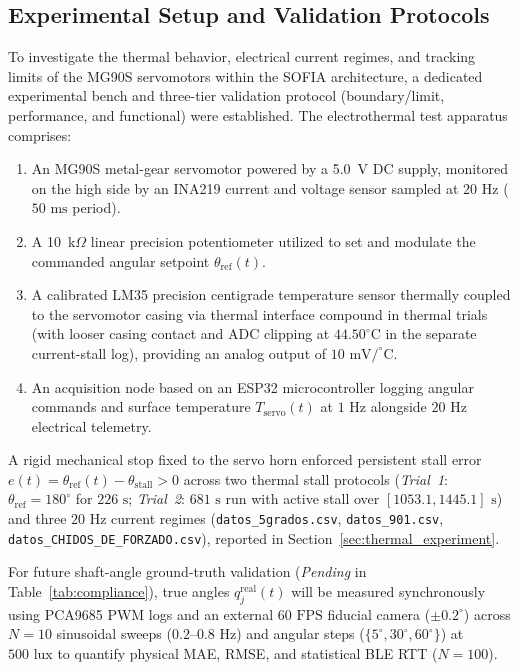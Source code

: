 \documentclass[lettersize,journal]{IEEEtran}
\begin{document}
	\subsection{Experimental Setup and Validation Protocols}
	\label{sec:thermal_setup}
	
	To investigate the thermal behavior, electrical current regimes, and tracking limits of the MG90S servomotors within the SOFIA architecture, a dedicated experimental bench and three-tier validation protocol (boundary/limit, performance, and functional) were established. The electrothermal test apparatus comprises:
	\begin{enumerate}
		\item {}An MG90S metal-gear servomotor powered by a 5.0~V DC supply, monitored on the high side by an INA219 current and voltage sensor sampled at $20\text{ Hz}$ ($50\text{ ms}$ period).
		\item A 10~k$\Omega$ linear precision potentiometer utilized to set and modulate the commanded angular setpoint $\theta_{\text{ref}}(t)$.
		\item {}A calibrated LM35 precision centigrade temperature sensor thermally coupled to the servomotor casing via thermal interface compound in thermal trials (with looser casing contact and ADC clipping at $44.50^\circ\text{C}$ in the separate current-stall log), providing an analog output of $10\text{ mV}/^\circ\text{C}$.
		\item {}An acquisition node based on an ESP32 microcontroller logging angular commands and surface temperature $T_{\text{servo}}(t)$ at $1\text{ Hz}$ alongside $20\text{ Hz}$ electrical telemetry.
	\end{enumerate}
	
	A rigid mechanical stop fixed to the servo horn enforced persistent stall error $e(t) = \theta_{\text{ref}}(t) - \theta_{\text{stall}} > 0$ across two thermal stall protocols (\textit{Trial~1}: $\theta_{\text{ref}} = 180^\circ$ for $226\text{ s}$; \textit{Trial~2}: $681\text{ s}$ run with active stall over $[1053.1, 1445.1]\text{ s}$) and three $20\text{ Hz}$ current regimes (\texttt{datos\_5grados.csv}, \texttt{datos\_901.csv}, \texttt{datos\_CHIDOS\_DE\_FORZADO.csv}), reported in Section~\ref{sec:thermal_experiment}.
	
	For future shaft-angle ground-truth validation (\textit{Pending} in Table~\ref{tab:compliance}), true angles $q_j^{\text{real}}(t)$ will be measured synchronously using PCA9685 PWM logs and an external $60\text{ FPS}$ fiducial camera ($\pm 0.2^\circ$) across $N=10$ sinusoidal sweeps ($0.2\text{--}0.8\text{ Hz}$) and angular steps ($\{5^\circ, 30^\circ, 60^\circ\}$) at $500\text{ lux}$ to quantify physical MAE, RMSE, and statistical BLE RTT ($N=100$).
	
\end{document}
